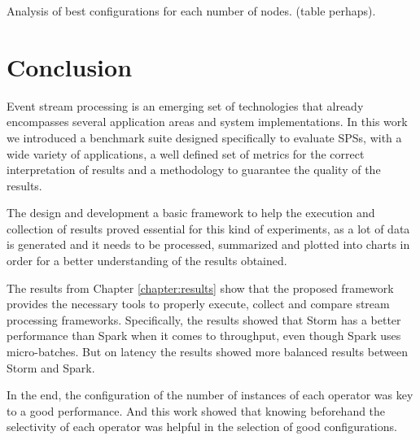\documentclass[ppgc,diss,english]{iiufrgs}
\begin{document}
Analysis of best configurations for each number of nodes. (table perhaps).








\chapter{Conclusion}
\label{chapter:conclusion}

Event stream processing is an emerging set of technologies that already encompasses several application areas and system implementations. In this work we introduced a benchmark suite designed specifically to evaluate SPSs, with a wide variety of applications, a well defined set of metrics for the correct interpretation of results and a methodology to guarantee the quality of the results.

The design and development a basic framework to help the execution and collection of results proved essential for this kind of experiments, as a lot of data is generated and it needs to be processed, summarized and plotted into charts in order for a better understanding of the results obtained.

The results from Chapter \ref{chapter:results} show that the proposed framework provides the necessary tools to properly execute, collect and compare stream processing frameworks. Specifically, the results showed that Storm has a better performance than Spark when it comes to throughput, even though Spark uses micro-batches. But on latency the results showed more balanced results between Storm and Spark.

In the end, the configuration of the number of instances of each operator was key to a good performance. And this work showed that knowing beforehand the selectivity of each operator was helpful in the selection of good configurations.
\end{document}
